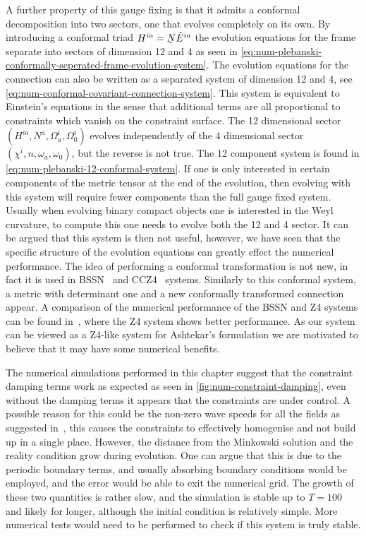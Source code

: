 \documentclass[10pt]{report}
\newcommand{\utilde}[1]{\underaccent{\tilde}{#1}}
\theoremstyle{definition}
\newcommand{\tE}[0]{\tilde{E}}
\newcommand{\dlap}[0]{\utilde{N}}
\begin{document}
    A further property of this gauge fixing is that it admits a conformal decomposition into two sectors, one that evolves completely on its own. By introducing a conformal triad $H^{ia} = \dlap \tE^{ia}$ the evolution equations for the frame separate into sectors of dimension 12 and 4 as seen in \cref{eq:num-plebanski-conformally-seperated-frame-evolution-system}. The evolution equations for the connection can also be written as a separated system of dimension 12 and 4, see \cref{eq:num-conformal-covariant-connection-system}. This system is equivalent to Einstein's equations in the sense that additional terms are all proportional to constraints which vanish on the constraint surface. The 12 dimensional sector $(H^{ia},N^a,\Omega^i_a,\Omega^i_0)$ evolves independently of the 4 dimensional sector $(\chi^i,n,\omega_a,\omega_0)$, but the reverse is not true. The 12 component system is found in \cref{eq:num-plebanski-12-conformal-system}. If one is only interested in certain components of the metric tensor at the end of the evolution, then evolving with this system will require fewer components than the full gauge fixed system. Usually when evolving binary compact objects one is interested in the Weyl curvature, to compute this one needs to evolve both the 12 and 4 sector. It can be argued that this system is then not useful, however, we have seen that the specific structure of the evolution equations can greatly effect the numerical performance. The idea of performing a conformal transformation is not new, in fact it is used in BSSN~\cite{On_the_Numerica_Baumga_1998,Evolution_of_th_Shibat_1995} and CCZ4~\cite{Conformal_and_c_Alic_2012} systems. Similarly to this conformal system, a metric with determinant one and a new conformally transformed connection appear. A comparison of the numerical performance of the BSSN and Z4 systems can be found in~\cite{Compact_binary_Hildit_2012}, where the Z4 system shows better performance. As our system can be viewed as a Z4-like system for Ashtekar's formulation we are motivated to believe that it may have some numerical benefits.

    The numerical simulations performed in this chapter suggest that the constraint damping terms work as expected as seen in \cref{fig:num-constraint-damping}, even without the damping terms it appears that the constraints are under control. A possible reason for this could be the non-zero wave speeds for all the fields as suggested in~\cite{Towards_an_unde_Alcubi_1999}, this causes the constraints to effectively homogenise and not build up in a single place. However, the distance from the Minkowski solution and the reality condition grow during evolution. One can argue that this is due to the periodic boundary terms, and usually absorbing boundary conditions would be employed, and the error would be able to exit the numerical grid. The growth of these two quantities is rather slow, and the simulation is stable up to $T = 100$ and likely for longer, although the initial condition is relatively simple. More numerical tests would need to be performed to check if this system is truly stable.
\end{document}
